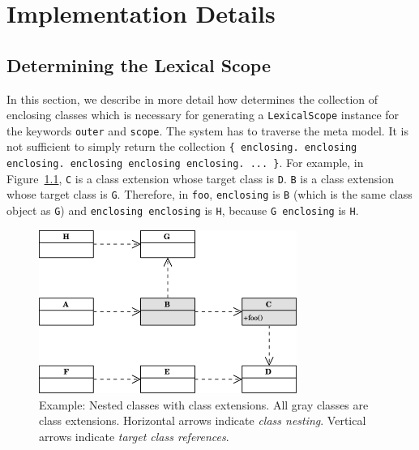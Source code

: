 
\chapter{Implementation Details}

\section{Determining the Lexical Scope}
\label{sec:app_lexical_scope}
In this section, we describe in more detail how \msname determines the collection of enclosing classes which is necessary for generating a \texttt{LexicalScope} instance for the keywords \texttt{outer} and \texttt{scope}. The system has to traverse the meta model. It is not sufficient to simply return the collection \texttt{\{ enclosing. enclosing enclosing. enclosing enclosing enclosing. ... \}}. For example, in Figure~\ref{fig:app_cls_diagr}, \texttt{C} is a class extension whose target class is \texttt{D}. \texttt{B} is a class extension whose target class is \texttt{G}. Therefore, in \texttt{foo}, \texttt{enclosing} is \texttt{B} (which is the same class object as \texttt{G}) and \texttt{enclosing enclosing} is \texttt{H}, because \texttt{G enclosing} is \texttt{H}.

\begin{figure}[!htp]
\includegraphics[width=0.75\textwidth]{app_cls_diagr.pdf}
\centering
\caption[Example: Nested classes with class extensions]{Example: Nested classes with class extensions. All gray classes are class extensions. Horizontal arrows indicate \emph{class nesting}. Vertical arrows indicate \emph{target class references}.}
\label{fig:app_cls_diagr}
\end{figure}

